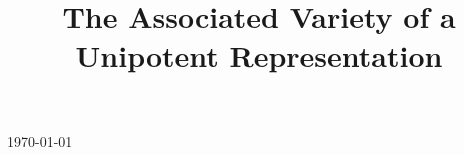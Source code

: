 \documentclass[11pt ,reqno]{amsart}
\begin{document}
\today\hfill



\bigskip

\title {The Associated Variety of a Unipotent Representation}

\maketitle



\newcommand\clrr{\color{red}}
\newcommand\clrblu{\color{blue}}

\newcommand\lr{\overset{LR}{<}}
\newcommand\elr{\overset{LR}{\approx}}

\newcommand\vh{{\vspace{0.3in}}}
\newcommand\ovl{\overline}
\newcommand\uset{\underset}
\newcommand\ub{\underbrace}
\newcommand\unl{\underline}


\newcommand \ov[1]{{\overline{#1}}}
\newcommand \fk[1]{{\mathfrak{#1}}}
\newcommand\unb[2]{{\underbrace{#2}_{#1}}}
\newcommand\und[1]{{\underline{#1}}}
\newcommand\ul[1]{{\underline{#1}}}
\newcommand\ma[2]{{\begin{matrix} #1\\#2\end{matrix}}}
\newcommand\maf[4]{{\begin{matrix} #1\\#2\\#3\\#4\end{matrix}}}
\newcommand \C[1]{{\mathcal #1}}
\newcommand \ch[1]{{\check{#1}}}
\newcommand \bb[1]{{\mathbb #1}}
\newcommand \wti[1]{{\widetilde #1}}

\newcommand\mat{\begin{matrix}}
\newcommand\emat{\end{matrix}}
\newcommand\pmat{\begin{pmatrix}}
\newcommand\epmat{\end{pmatrix}}

\newcommand\msp[1]{&\multispan#1\hrulefill}
\newcommand\tableau[1]{
 \vbox{\offinterlineskip \hrule
 \halign{&\vrule##&\strut\ \hfil##\hfil\ &\vrule##&\strut\ \hfil##\hfil\ \cr #1\cr}}}
\end{document}
